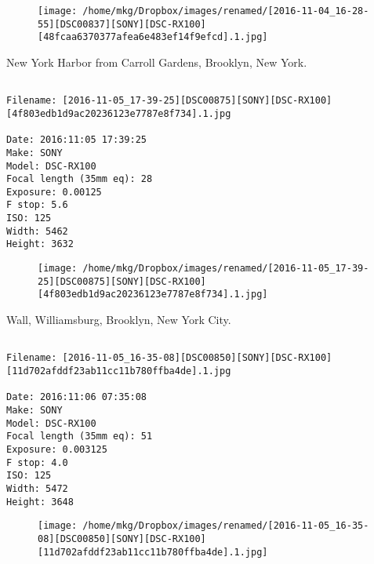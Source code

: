 \begin{figure}
\texttt{[image: /home/mkg/Dropbox/images/renamed/[2016-11-04\_16-28-55][DSC00837][SONY][DSC-RX100][48fcaa6370377afea6e483ef14f9efcd].1.jpg]}
\end{figure}
    
\clearpage
\onecolumn
\noindent New York Harbor from Carroll Gardens, Brooklyn, New York.
\noindent
\begin{lstlisting}

Filename: [2016-11-05_17-39-25][DSC00875][SONY][DSC-RX100][4f803edb1d9ac20236123e7787e8f734].1.jpg

Date: 2016:11:05 17:39:25
Make: SONY
Model: DSC-RX100
Focal length (35mm eq): 28
Exposure: 0.00125
F stop: 5.6
ISO: 125
Width: 5462
Height: 3632
\end{lstlisting}
\clearpage

\begin{figure}
\texttt{[image: /home/mkg/Dropbox/images/renamed/[2016-11-05\_17-39-25][DSC00875][SONY][DSC-RX100][4f803edb1d9ac20236123e7787e8f734].1.jpg]}
\end{figure}
    
\clearpage
\onecolumn
\noindent Wall, Williamsburg, Brooklyn, New York City.
\noindent
\begin{lstlisting}

Filename: [2016-11-05_16-35-08][DSC00850][SONY][DSC-RX100][11d702afddf23ab11cc11b780ffba4de].1.jpg

Date: 2016:11:06 07:35:08
Make: SONY
Model: DSC-RX100
Focal length (35mm eq): 51
Exposure: 0.003125
F stop: 4.0
ISO: 125
Width: 5472
Height: 3648
\end{lstlisting}
\clearpage

\begin{figure}
\texttt{[image: /home/mkg/Dropbox/images/renamed/[2016-11-05\_16-35-08][DSC00850][SONY][DSC-RX100][11d702afddf23ab11cc11b780ffba4de].1.jpg]}
\end{figure}
    
